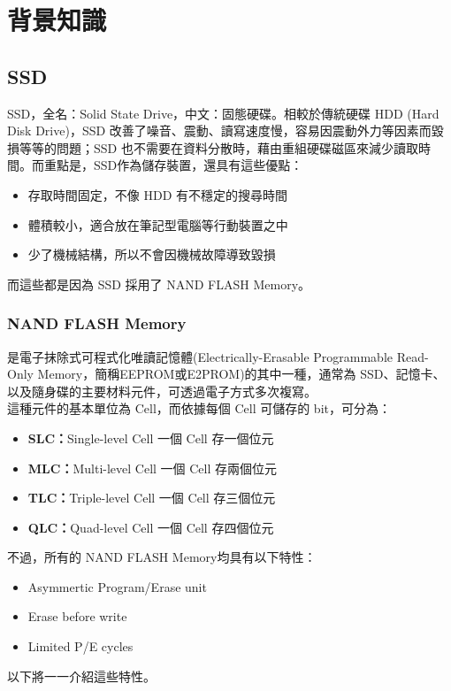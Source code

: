 \chapter{背景知識}

\section{SSD}\label{s2.1}
\indent
SSD，全名：Solid State Drive，中文：固態硬碟。相較於傳統硬碟 HDD (Hard Disk Drive)，SSD 改善了噪音、震動、讀寫速度慢，容易因震動外力等因素而毀損等等的問題；SSD 也不需要在資料分散時，藉由重組硬碟磁區來減少讀取時間。而重點是，SSD作為儲存裝置，還具有這些優點：\cite{SSD}
\begin{itemize}
    \item 存取時間固定，不像 HDD 有不穩定的搜尋時間
    \item 體積較小，適合放在筆記型電腦等行動裝置之中
    \item 少了機械結構，所以不會因機械故障導致毀損
\end{itemize}

而這些都是因為 SSD 採用了 NAND FLASH Memory。\cite{SSDFANS}

\subsection{NAND FLASH Memory}\label{s2.1.1}
\indent
是電子抹除式可程式化唯讀記憶體(Electrically-Erasable Programmable Read-Only Memory，簡稱EEPROM或E2PROM)的其中一種，通常為 SSD、記憶卡、以及隨身碟的主要材料元件，可透過電子方式多次複寫。\\
這種元件的基本單位為 Cell，而依據每個 Cell 可儲存的 bit，可分為：\cite{2014xv}
\begin{itemize}
    \item \textbf{SLC：}Single-level Cell   一個 Cell 存一個位元
    \item \textbf{MLC：}Multi-level Cell    一個 Cell 存兩個位元
    \item \textbf{TLC：}Triple-level Cell   一個 Cell 存三個位元
    \item \textbf{QLC：}Quad-level Cell     一個 Cell 存四個位元
\end{itemize}
不過，所有的 NAND FLASH Memory均具有以下特性：
\begin{itemize}
    \item Asymmertic Program/Erase unit
    \item Erase before write
    \item Limited P/E cycles
\end{itemize}
以下將一一介紹這些特性。

